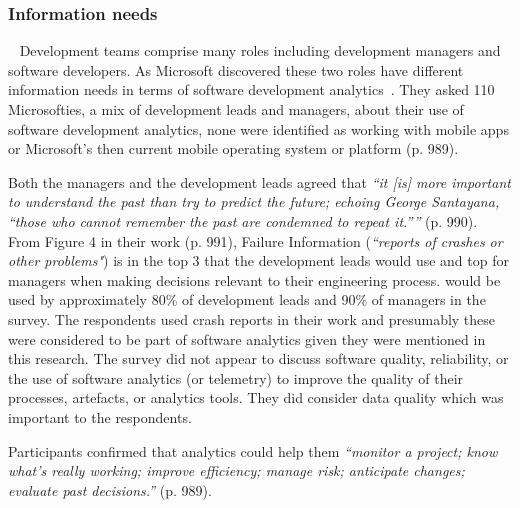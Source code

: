 \subsubsection{Information needs}~\label{rw-information-needs-research}
Development teams comprise many roles including development managers and software developers. As Microsoft discovered these two roles have different information needs in terms of software development analytics~. They asked 110 Microsofties, a mix of development leads and managers, about their use of software development analytics, none were identified as working with mobile apps or Microsoft's then current mobile operating system or platform (p. 989). 

Both the managers and the development leads agreed that \emph{``it [is] more important to understand the past than try to predict the future; echoing George Santayana, ``those who cannot remember the past are condemned to repeat it.''''} (p. 990). From Figure 4 in their work (p. 991), Failure Information (\emph{``reports of crashes or other problems"}) is in the top 3 that the development leads would use and top for managers when making decisions relevant to their engineering process.  would be used by approximately 80\% of development leads and 90\% of managers in the survey. The respondents used crash reports in their work and presumably these were considered to be part of software analytics given they were mentioned in this research. The survey did not appear to discuss software quality, reliability, or the use of software analytics (or telemetry) to improve the quality of their processes, artefacts, or analytics tools. They did consider data quality which was important to the respondents.

Participants confirmed that analytics could help them \emph{``monitor a project; know what's really working; improve efficiency; manage risk; anticipate changes; evaluate past decisions.''} (p. 989).

